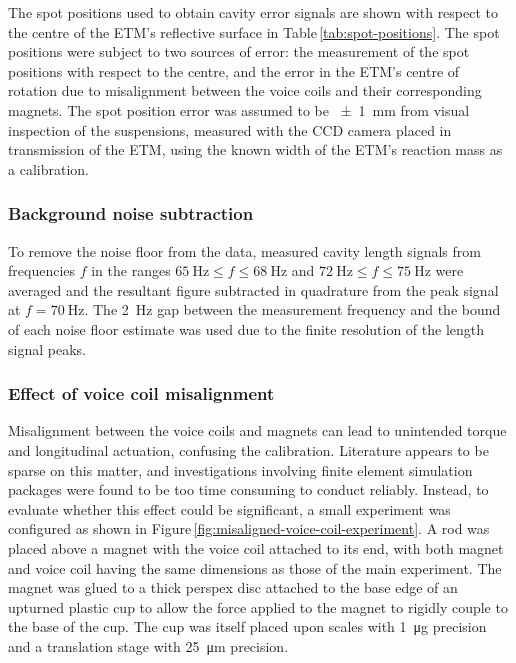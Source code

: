 The spot positions used to obtain cavity error signals are shown with respect to the centre of the \gls{ETM}'s reflective surface in Table\,\ref{tab:spot-positions}. The spot positions were subject to two sources of error: the measurement of the spot positions with respect to the centre, and the error in the \gls{ETM}'s centre of rotation due to misalignment between the voice coils and their corresponding magnets. The spot position error was assumed to be \SI{\pm1}{\milli\meter} from visual inspection of the suspensions, measured with the CCD camera placed in transmission of the \gls{ETM}, using the known width of the \gls{ETM}'s reaction mass as a calibration.

\subsubsection{Background noise subtraction}
To remove the noise floor from the data, measured cavity length signals from frequencies $f$ in the ranges $\SI{65}{\hertz} \le f \le \SI{68}{\hertz}$ and $\SI{72}{\hertz} \le f \le \SI{75}{\hertz}$ were averaged and the resultant figure subtracted in quadrature from the peak signal at $f = \SI{70}{\hertz}$. The \SI{2}{\hertz} gap between the measurement frequency and the bound of each noise floor estimate was used due to the finite resolution of the length signal peaks.

\subsubsection{Effect of voice coil misalignment}
Misalignment between the voice coils and magnets can lead to unintended torque and longitudinal actuation, confusing the calibration. Literature appears to be sparse on this matter, and investigations involving finite element simulation packages were found to be too time consuming to conduct reliably. Instead, to evaluate whether this effect could be significant, a small experiment was configured as shown in Figure\,\ref{fig:misaligned-voice-coil-experiment}. A rod was placed above a magnet with the voice coil attached to its end, with both magnet and voice coil having the same dimensions as those of the main experiment. The magnet was glued to a thick perspex disc attached to the base edge of an upturned plastic cup to allow the force applied to the magnet to rigidly couple to the base of the cup. The cup was itself placed upon scales with \SI{1}{\micro\gram} precision and a translation stage with \SI{25}{\micro\meter} precision.

